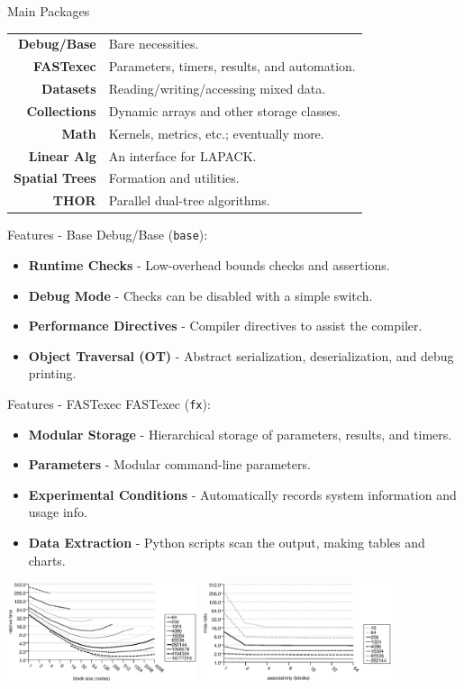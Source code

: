 \documentclass[pdf,colorBG,slideColor]{prosper}
\newcommand{\itemt}[1]{\item {\bf #1} -}
\begin{document}
\begin{slide}{Main Packages}
 \begin{tabular}{rl}
   {\bf Debug/Base}    & Bare necessities. \\
   {\bf FASTexec}      & Parameters, timers, results, and automation. \\
   {\bf Datasets}      & Reading/writing/accessing mixed data. \\
   {\bf Collections}   & Dynamic arrays and other storage classes. \\
   {\bf Math}          & Kernels, metrics, etc.; eventually more. \\
   {\bf Linear Alg}    & An interface for LAPACK. \\
   {\bf Spatial Trees} & Formation and utilities. \\
   {\bf THOR}          & Parallel dual-tree algorithms.
 \end{tabular}
\end{slide}

\begin{slide}{Features - Base}
 Debug/Base ({\tt base}):
 \begin{itemize}
 \itemt{Runtime Checks} Low-overhead bounds checks and assertions.
 \itemt{Debug Mode} Checks can be disabled with a simple switch.
 \itemt{Performance Directives} Compiler directives to assist the compiler.
 \itemt{Object Traversal (OT)} Abstract serialization, deserialization, and debug printing.
 \end{itemize}
\end{slide}

\begin{slide}{Features - FASTexec}
 FASTexec ({\tt fx}):
 \begin{itemize}
 \itemt{Modular Storage} Hierarchical storage of parameters, results, and timers.
 \itemt{Parameters} Modular command-line parameters.
 \itemt{Experimental Conditions}
   Automatically records system information and usage info.
 \itemt{Data Extraction} Python scripts scan the output, making tables and charts.
 \end{itemize}
 \vspace{-.2in}
  \includegraphics[width=2.2in]{g_blocksizes_t.ps}
  \includegraphics[width=2.2in]{g_assoc.ps}
\end{slide}
\end{document}
